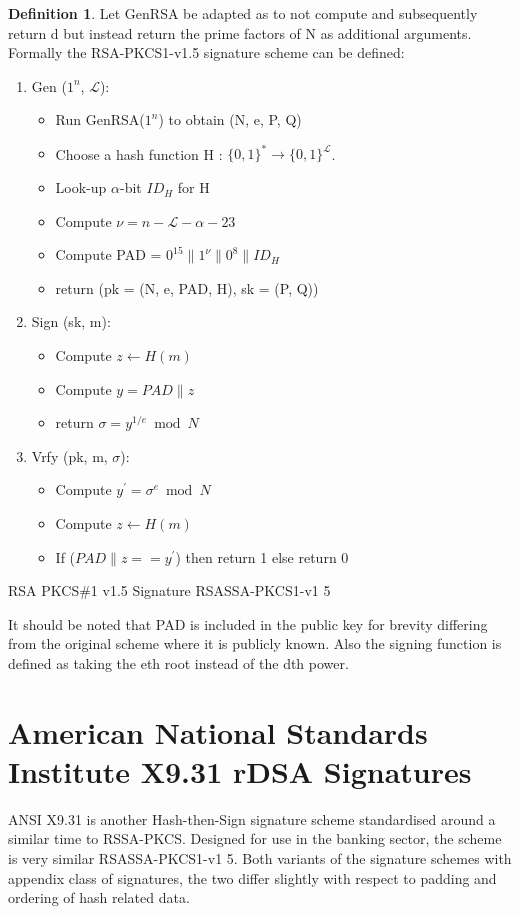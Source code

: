 \documentclass[]{final_report}
\theoremstyle{definition}
\newtheorem{definition}{Definition}[chapter]
\begin{document}
\begin{definition}
Let GenRSA be adapted as to not compute and subsequently return d but instead return the prime factors of N as additional arguments. Formally the RSA-PKCS1-v1.5 signature scheme can be defined:
\begin{enumerate}
    \item Gen ($1^n$, $\mathcal{L}$): 
    \begin{itemize}
    \item[] Run GenRSA($1^n$) to obtain (N, e, P, Q)
    \item[] Choose a hash function H : $\{0, 1\}^* \rightarrow \{0, 1\}^\mathcal{L}$.
    \item[] Look-up $\alpha$-bit $ID_{H}$ for H
    \item[] Compute $\nu = n - \mathcal{L} - \alpha - 23$
    \item[] Compute PAD = $0^{15} \| 1^{\nu} \| 0^8 \| ID_{H}$
    \item[] return (pk = (N, e, PAD, H), sk = (P, Q))
    \end{itemize}

    \item Sign (sk, m):
    \begin{itemize}
    \item[] Compute $z \leftarrow H(m)$
    \item[] Compute $y = PAD  \| z$
    \item[] return $\sigma = y^{1/e} \bmod N$
    \end{itemize}
   
    \item Vrfy (pk, m, $\sigma$):  
    \begin{itemize}
    \item[] Compute $y^{'} = \sigma^{e} \bmod N$
    \item[] Compute $z \leftarrow H(m)$
    \item[] If ($PAD \| z == y^{'}$) then return 1 else return 0
    \end{itemize}
\end{enumerate}
RSA PKCS\#1 v1.5 Signature RSASSA-PKCS1-v1 5
\end{definition}
It should be noted that PAD is included in the public key for brevity differing from the original scheme where it is publicly known. Also the signing function is defined as taking the eth root instead of the dth power.

\section{American National Standards Institute X9.31 rDSA Signatures}
ANSI X9.31 is another Hash-then-Sign signature scheme standardised around a similar time to RSSA-PKCS. Designed for use in the banking sector, the scheme is very similar RSASSA-PKCS1-v1 5. Both variants of the signature schemes with appendix class of signatures, the two differ slightly with respect to padding and ordering of hash related data.
\end{document}
